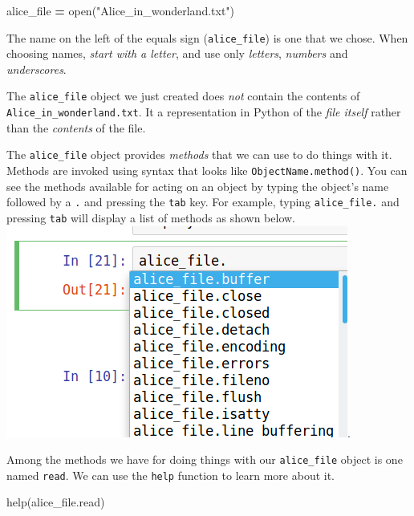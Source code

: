 \documentclass[]{book}
\newenvironment{Shaded}{\begin{snugshade}}{\end{snugshade}}
\newcommand{\StringTok}[1]{\textcolor[rgb]{0.31,0.60,0.02}{#1}}
\newcommand{\OperatorTok}[1]{\textcolor[rgb]{0.81,0.36,0.00}{\textbf{#1}}}
\newcommand{\BuiltInTok}[1]{#1}
\newcommand{\NormalTok}[1]{#1}
\begin{document}
\begin{Shaded}
\begin{Highlighting}[]
\NormalTok{alice_file }\OperatorTok{=} \BuiltInTok{open}\NormalTok{(}\StringTok{"Alice_in_wonderland.txt"}\NormalTok{)}
\end{Highlighting}
\end{Shaded}

The name on the left of the equals sign (\texttt{alice\_file}) is one
that we chose. When choosing names, \emph{start with a letter}, and use
only \emph{letters}, \emph{numbers} and \emph{underscores}.

The \texttt{alice\_file} object we just created does \emph{not} contain
the contents of \texttt{Alice\_in\_wonderland.txt}. It a representation
in Python of the \emph{file itself} rather than the \emph{contents} of
the file.

The \texttt{alice\_file} object provides \emph{methods} that we can use
to do things with it. Methods are invoked using syntax that looks like
\texttt{ObjectName.method()}. You can see the methods available for
acting on an object by typing the object's name followed by a \texttt{.}
and pressing the \texttt{tab} key. For example, typing
\texttt{alice\_file.} and pressing \texttt{tab} will display a list of
methods as shown below.
\includegraphics{Python/PythonIntro/images/notebook_file_completion.png}.

Among the methods we have for doing things with our \texttt{alice\_file}
object is one named \texttt{read}. We can use the \texttt{help} function
to learn more about it.

\begin{Shaded}
\begin{Highlighting}[]
\BuiltInTok{help}\NormalTok{(alice_file.read)}
\end{Highlighting}
\end{Shaded}
\end{document}
